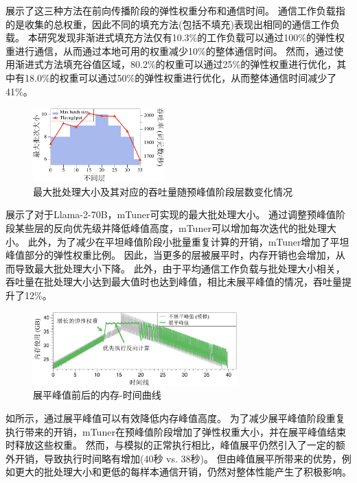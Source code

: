 展示了这三种方法在前向传播阶段的弹性权重分布和通信时间。  
通信工作负载指的是收集的总权重，因此不同的填充方法(包括不填充)表现出相同的通信工作负载。  
本研究发现非渐进式填充方法仅有10.3\%的工作负载可以通过100\%的弹性权重进行通信，从而通过本地可用的权重减少10\%的整体通信时间。  
然而，通过使用渐进式方法填充谷值区域，80.2\%的权重可以通过25\%的弹性权重进行优化，其中有18.0\%的权重可以通过50\%的弹性权重进行优化，从而整体通信时间减少了41\%。

\begin{figure}[ht]
\centerline{\includegraphics[width=0.45\textwidth]{figures/mtuner/exp-img/peak-crop.pdf}}
\caption{最大批处理大小及其对应的吞吐量随预峰值阶段层数变化情况}
\label{fig:eval-peak}
\end{figure}

展示了对于Llama-2-70B，mTuner可实现的最大批处理大小。  
通过调整预峰值阶段某些层的反向优先级并降低峰值高度，mTuner可以增加每次迭代的批处理大小。  
此外，为了减少在平坦峰值阶段小批量重复计算的开销，mTuner增加了平坦峰值部分的弹性权重比例。  
因此，当更多的层被展平时，内存开销也会增加，从而导致最大批处理大小下降。  
此外，由于平均通信工作负载与批处理大小相关，吞吐量在批处理大小达到最大值时也达到峰值，相比未展平峰值的情况，吞吐量提升了12\%。

\begin{figure}[ht]
\centerline{\includegraphics[width=0.7\textwidth]{figures/mtuner/exp-img/peak-flatten-crop.pdf}}
\caption{展平峰值前后的内存-时间曲线}
\label{fig:eval-flattened-peak}
\end{figure}

如所示，通过展平峰值可以有效降低内存峰值高度。  
为了减少展平峰值阶段重复执行带来的开销，mTuner在预峰值阶段增加了弹性权重大小，并在展平峰值结束时释放这些权重。  
然而，与模拟的正常执行相比，峰值展平仍然引入了一定的额外开销，导致执行时间略有增加(40秒 vs. 38秒)。  
但由峰值展平所带来的优势，例如更大的批处理大小和更低的每样本通信开销，仍然对整体性能产生了积极影响。

